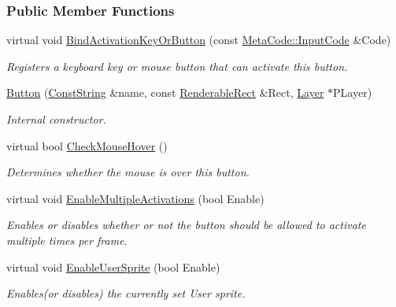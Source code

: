 \subsubsection*{Public Member Functions}
\begin{DoxyCompactItemize}
\item 
virtual void \hyperlink{classMezzanine_1_1UI_1_1Button_aae0a7f6a07f79856ed6da8b8b3bc5ecd}{BindActivationKeyOrButton} (const \hyperlink{classMezzanine_1_1MetaCode_a3b5633f0145bf3287cf53a3f05b5563c}{MetaCode::InputCode} \&Code)
\begin{DoxyCompactList}\small\item\em Registers a keyboard key or mouse button that can activate this button. \item\end{DoxyCompactList}\item 
\hyperlink{classMezzanine_1_1UI_1_1Button_a910cce5a558e9f41ede146e9675b757f}{Button} (\hyperlink{namespaceMezzanine_a63cd699ac54b73953f35ec9cfc05e506}{ConstString} \&name, const \hyperlink{structMezzanine_1_1UI_1_1RenderableRect}{RenderableRect} \&Rect, \hyperlink{classMezzanine_1_1UI_1_1Layer}{Layer} $\ast$PLayer)
\begin{DoxyCompactList}\small\item\em Internal constructor. \item\end{DoxyCompactList}\item 
virtual bool \hyperlink{classMezzanine_1_1UI_1_1Button_ae35f5b685df6bb09626f3f53b41416bd}{CheckMouseHover} ()
\begin{DoxyCompactList}\small\item\em Determines whether the mouse is over this button. \item\end{DoxyCompactList}\item 
virtual void \hyperlink{classMezzanine_1_1UI_1_1Button_ab68c4ae03c41abb6d25179962f4e4f60}{EnableMultipleActivations} (bool Enable)
\begin{DoxyCompactList}\small\item\em Enables or disables whether or not the button should be allowed to activate multiple times per frame. \item\end{DoxyCompactList}\item 
virtual void \hyperlink{classMezzanine_1_1UI_1_1Button_af01bb0b214995c3cb6af06fcaa84975d}{EnableUserSprite} (bool Enable)
\begin{DoxyCompactList}\small\item\em Enables(or disables) the currently set User sprite. \item\end{DoxyCompactList}\item 

\end{DoxyCompactItemize}
